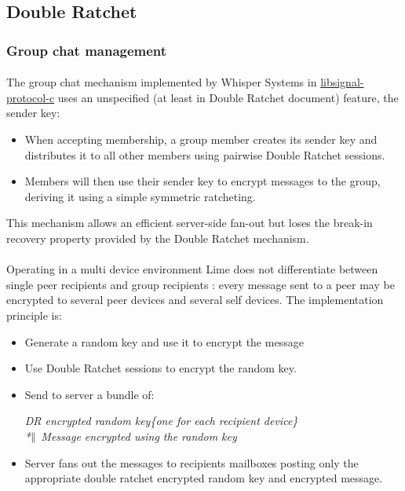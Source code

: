 \documentclass[a4paper,11pt]{article}
\begin{document}
  \subsection{Double Ratchet}
  \subsubsection{Group chat management}
    \label{subsubsec:groupchat}
    \paragraph*{}The group chat mechanism implemented by Whisper Systems in \href{https://github.com/WhisperSystems/libsignal-protocol-c}{libsignal-protocol-c}\cite{libsignal} uses an unspecified (at least in Double Ratchet document\cite{doubleRatchet}) feature, the sender key:
    \begin{itemize}
      \item When accepting membership, a group member creates its sender key and distributes it to all other members using pairwise Double Ratchet sessions.
      \item Members will then use their sender key to encrypt messages to the group, deriving it using a simple symmetric ratcheting.
    \end{itemize}
    This mechanism allows an efficient server-side fan-out but loses the break-in recovery property provided by the Double Ratchet mechanism.
    
    \paragraph*{}Operating in a multi device environment Lime does not differentiate between single peer recipients and group recipients : every message sent to a peer may be encrypted to several peer devices and several self devices. The implementation principle is:
    \begin{itemize}
      \item Generate a random key and use it to encrypt the message
      \item Use Double Ratchet sessions to encrypt the random key.
      \item Send to server a bundle of:
        \begin{center}
          \textit{DR encrypted random key\{one for each recipient device\}\\*$\Arrowvert$ Message encrypted using the random key}
        \end{center}
      \item Server fans out the messages to recipients mailboxes posting only the appropriate double ratchet encrypted random key and encrypted message.
    \end{itemize}
\end{document}

